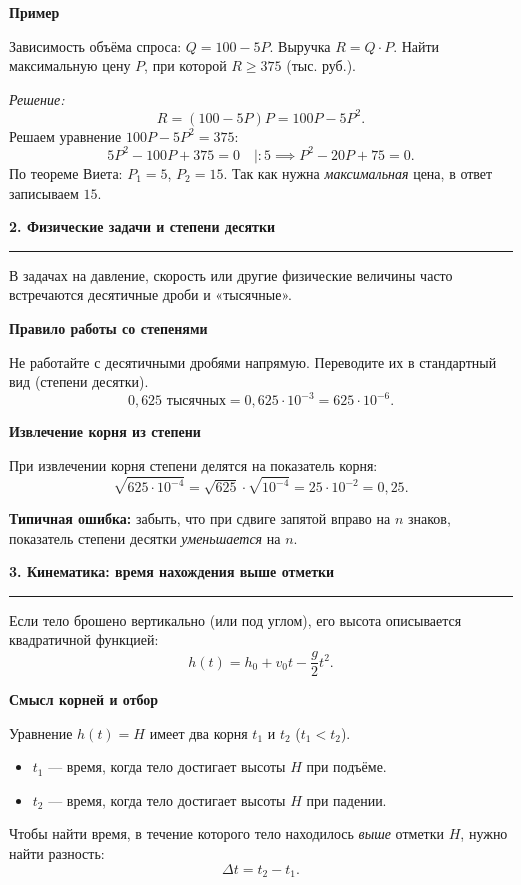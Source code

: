 \documentclass[a4paper,12pt]{article}
\newcommand{\SectionTitle}[1]{%
  \vspace{0.8em}
  {\Large\bfseries\textcolor{darkaccent}{#1}}\par
  \vspace{0.2em}
  {\color{accent}\rule{\linewidth}{0.8pt}}
  \vspace{0.4em}
}
\newcommand{\MiniTitle}[1]{%
  \vspace{0.45em}
  {\bfseries\textcolor{darkaccent}{#1}}\par
}
\newcommand{\Important}[1]{%
  \textcolor{darkaccent}{\bfseries #1}
}
\begin{document}
\MiniTitle{Пример}
Зависимость объёма спроса: $Q = 100 - 5P$. Выручка $R = Q \cdot P$. Найти максимальную цену $P$, при которой $R \ge 375$ (тыс. руб.).

\textit{Решение:}
\[
R = (100 - 5P)P = 100P - 5P^2.
\]
Решаем уравнение $100P - 5P^2 = 375$:
\[
5P^2 - 100P + 375 = 0 \quad \Big| :5 \implies P^2 - 20P + 75 = 0.
\]
По теореме Виета: $P_1 = 5$, $P_2 = 15$.
Так как нужна \textit{максимальная} цена, в ответ записываем $15$.

\SectionTitle{2. Физические задачи и степени десятки}

В задачах на давление, скорость или другие физические величины часто встречаются десятичные дроби и «тысячные».

\MiniTitle{Правило работы со степенями}
Не работайте с десятичными дробями напрямую. Переводите их в стандартный вид (степени десятки).
\[
0{,}625 \text{ тысячных} = 0{,}625 \cdot 10^{-3} = 625 \cdot 10^{-6}.
\]

\MiniTitle{Извлечение корня из степени}
При извлечении корня степени делятся на показатель корня:
\[
\sqrt{625 \cdot 10^{-4}} = \sqrt{625} \cdot \sqrt{10^{-4}} = 25 \cdot 10^{-2} = 0{,}25.
\]

\Important{Типичная ошибка:} забыть, что при сдвиге запятой вправо на $n$ знаков, показатель степени десятки \textit{уменьшается} на $n$.

\SectionTitle{3. Кинематика: время нахождения выше отметки}

Если тело брошено вертикально (или под углом), его высота описывается квадратичной функцией:
\[
h(t) = h_0 + v_0 t - \frac{g}{2} t^2.
\]

\MiniTitle{Смысл корней и отбор}
Уравнение $h(t) = H$ имеет два корня $t_1$ и $t_2$ ($t_1 < t_2$).
\begin{itemize}
\item $t_1$ — время, когда тело достигает высоты $H$ при подъёме.
\item $t_2$ — время, когда тело достигает высоты $H$ при падении.
\end{itemize}

Чтобы найти время, в течение которого тело находилось \textit{выше} отметки $H$, нужно найти разность:
\[
\Delta t = t_2 - t_1.
\]

\begin{center}
\end{center}
\end{document}
